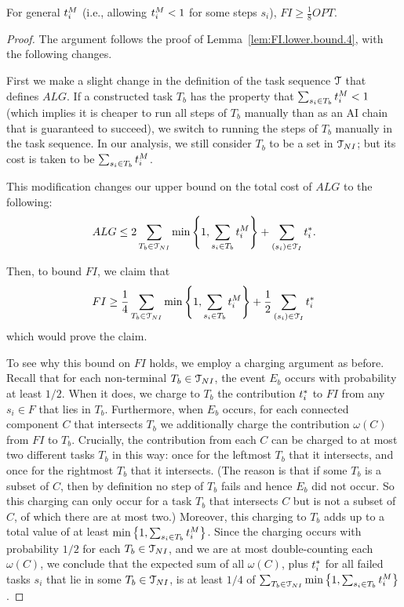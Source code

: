 \begin{lem}
\label{lem:FI.lower.bound.8}
    For general $t^{M}_{i}$ (i.e., allowing $t^{M}_{i} < 1$ for some steps $s_i$), $FI \geq \frac{1}{8}OPT$.
\end{lem}
\begin{proof}
    The argument follows the proof of Lemma~\ref{lem:FI.lower.bound.4}, with the following changes.

    First we make a slight change in the definition of the task sequence $\mathcal{T}$ that defines $ALG$.
    If a constructed task $T_b$ has the property that $\sum_{s_i \in T_b} t^{M}_{i} < 1$ (which implies it is cheaper to run all steps of $T_b$ manually than as an AI chain that is guaranteed to succeed), we switch to running the steps of $T_b$ manually in the task sequence.
    In our analysis, we still consider $T_b$ to be a set in $\mathcal{T}_{NI}$; but its cost is taken to be $\sum_{s_i \in T_b} t^{M}_{i}$.

    This modification changes our upper bound on the total cost of $ALG$ to the following:
    \[ ALG \leq 2 \sum_{T_b \in \mathcal{T}_{NI}} \min\left\{1, \sum_{s_i \in T_b} t^{M}_{i} \right\} + \sum_{ (s_i) \in \mathcal{T}_I} t^*_{i}. \]

    Then, to bound $FI$, we claim that
    \[ FI \geq \frac{1}{4}\sum_{T_b \in \mathcal{T}_{NI}} \min\left\{1, \sum_{s_i \in T_b} t^{M}_{i} \right\} + \frac{1}{2}\sum_{(s_i) \in \mathcal{T}_I} t^*_{i} \]
    which would prove the claim.

    To see why this bound on $FI$ holds, we employ a charging argument as before.
    Recall that for each non-terminal $T_b \in \mathcal{T}_{NI}$, the event $E_b$ occurs with probability at least $1/2$.
    When it does, we charge to $T_b$ the contribution $t^*_{i}$ to $FI$ from any $s_i \in F$ that lies in $T_b$.
    Furthermore, when $E_b$ occurs, for each connected component $C$ that intersects $T_b$ we additionally charge the contribution $\omega(C)$ from $FI$ to $T_b$.
    Crucially, the contribution from each $C$ can be charged to at most two different tasks $T_b$ in this way: once for the leftmost $T_b$ that it intersects, and once for the rightmost $T_b$ that it intersects.
    (The reason is that if some $T_b$ is a subset of $C$, then by definition no step of $T_b$ fails and hence $E_b$ did not occur.
    So this charging can only occur for a task $T_b$ that intersects $C$ but is not a subset of $C$, of which there are at most two.)
    Moreover, this charging to $T_b$ adds up to a  total value of at least $\min\left\{1, \sum_{s_i \in T_b} t^{M}_{i} \right\}$.
    Since the charging occurs with probability $1/2$ for each $T_b \in \mathcal{T}_{NI}$, and we are at most double-counting each $\omega(C)$, we conclude that the expected sum of all $\omega(C)$, plus $t^*_{i}$ for all failed tasks $s_i$ that lie in some $T_b \in \mathcal{T}_{NI}$, is at least $1/4$ of $\sum_{T_b \in \mathcal{T}_{NI}}\min\left\{1, \sum_{s_i \in T_b} t^{M}_{i} \right\}$.


\end{proof}

